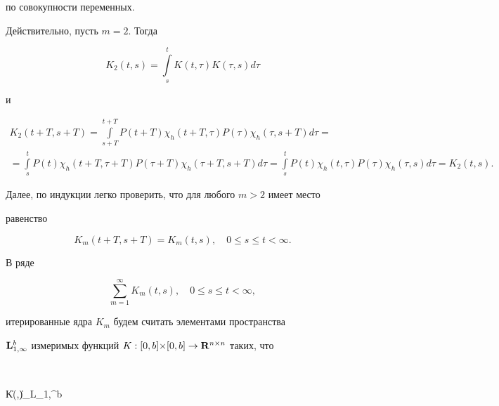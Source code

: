 по совокупности переменных.





Действительно, пусть $m=2$. Тогда


$$


K_2(t,s)=\int\limits_s^tK(t,\tau)K(\tau ,s)d\tau


$$


и


\begin{gather*}


K_2(t+T,s+T)=\int\limits_{s+T}^{t+T}P(t+T){\chi}_h


(t+T,{\tau})P({\tau}){\chi}_h


({\tau},s+T)d{\tau}=\\


%


=\int\limits_s^tP(t){\chi}_h(t{+}T,\tau{+}T)P(\tau{+}T)


{\chi}_h(\tau{+}T,s{+}T)


d\tau=\int\limits_s^tP(t){\chi}_h(t,\tau)P(\tau){\chi}_h(\tau,s)d{\tau}=


K_2(t,s).


\end{gather*}





Далее, по индукции легко проверить, что для любого $m>2$ имеет место


равенство


$$


K_m(t+T,s+T)=K_m(t,s),\quad 0\le s\le t<{\infty}.


$$





В ряде


\begin{equation}


\sum_{m=1}^{\infty}K_m(t,s),\quad 0\le s\le t<{\infty},


\end{equation}


итерированные ядра $K_m$ будем считать элементами пространства


${\spc L}_{1,{\infty}}^b$ измеримых функций $K:[0,b]{\times}[0,b]\to 


{\bold R}^{n{\times}n}$ таких, что


$$


\| K(\cdot,\cdot)\|_{\bold L_{1,{\infty}}^b}


\eqdef


